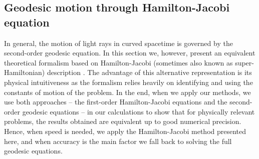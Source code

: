\documentclass{aa}
\begin{document}
\subsection{Geodesic motion through Hamilton-Jacobi equation}\label{sect:hamjac}
In general, the motion of light rays in curved spacetime is governed by the second-order geodesic equation.
In this section we, however, present an equivalent theoretical formalism based on Hamilton-Jacobi (sometimes also known as super-Hamiltonian) description \citep{MTW73, cha}.
The advantage of this alternative representation is its physical intuitiveness as the formalism relies heavily on identifying and using the constants of motion of the problem.
In the end, when we apply our methods, we use both approaches -- the first-order Hamilton-Jacobi equations and the second-order geodesic equations -- in our calculations to show that for physically relevant problems, the results obtained are equivalent up to good numerical precision.
Hence, when speed is needed, we apply the Hamilton-Jacobi method presented here, and when accuracy is the main factor we fall back to solving the full geodesic equations.
\end{document}
